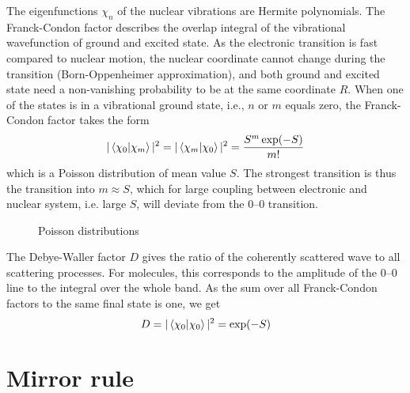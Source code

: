 The eigenfunctions $\chi_n$ of the nuclear vibrations are Hermite polynomials. The Franck-Condon factor describes the overlap integral of the vibrational wavefunction of ground and excited state. As the electronic transition is fast compared to nuclear motion, the nuclear coordinate cannot change during the transition (Born-Oppenheimer approximation), and both ground and excited state need a non-vanishing probability to be at the same coordinate $R$. When one of the states is in a vibrational ground state, i.e., $n$ or $m$ equals zero, the Franck-Condon factor takes the form
\begin{equation}
 | \braket{ \chi_0 | \chi_m } | ^2  =  | \braket{ \chi_m | \chi_0 } | ^2 = \frac{S^m \exp(-S)}{m!}
\end{equation}
which is a Poisson distribution of mean value $S$.  The strongest transition is thus the transition into $m \approx S$, which for large coupling between electronic and nuclear system, i.e. large $S$, will deviate from the 0--0 transition.

\begin{figure}
   
  \caption{Poisson distributions}
\end{figure}

The Debye-Waller factor $D$ gives the ratio of the coherently scattered wave to all scattering processes. For molecules, this corresponds to the amplitude of the 0--0 line to the integral over the whole band. As the sum over all Franck-Condon factors to the same final state is one, we get
\begin{equation}
 D =  | \braket{ \chi_0 | \chi_0 } | ^2 = \exp(-S)
\end{equation}


\section{Mirror rule}



